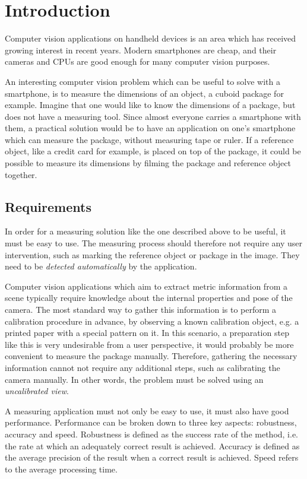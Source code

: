 \chapter{Introduction}
Computer vision applications on handheld devices is an area which has received growing interest in recent years. 
Modern smartphones are cheap, and their cameras and CPUs are good enough for many computer vision purposes.

An interesting computer vision problem which can be useful to solve with a smartphone, is to measure the dimensions of an object, a cuboid package for example.
Imagine that one would like to know the dimensions of a package, but does not have a measuring tool.
Since almost everyone carries a smartphone with them, a practical solution would be to have an application on one's smartphone which can measure the package, without measuring tape or ruler.
If a reference object, like a credit card for example, is placed on top of the package, it could be possible to measure its dimensions by filming the package and reference object together.

\section{Requirements} \label{introduction:requirements}
In order for a measuring solution like the one described above to be useful, it must be easy to use. 
The measuring process should therefore not require any user intervention, such as marking the reference object or package in the image. 
They need to be \textit{detected automatically} by the application.

Computer vision applications which aim to extract metric information from a scene typically require knowledge about the internal properties and pose of the camera.
The most standard way to gather this information is to perform a calibration procedure in advance, by observing a known calibration object, e.g. a printed paper with a special pattern on it.
In this scenario, a preparation step like this is very undesirable from a user perspective, it would probably be more convenient to measure the package manually.
Therefore, gathering the necessary information cannot not require any additional steps, such as calibrating the camera manually.
In other words, the problem must be solved using an \textit{uncalibrated view}.

A measuring application must not only be easy to use, it must also have good performance.
Performance can be broken down to three key aspects: robustness, accuracy and speed.
Robustness is defined as the success rate of the method, i.e. the rate at which an adequately correct result is achieved.
Accuracy is defined as the average precision of the result when a correct result is achieved.
Speed refers to the average processing time.

